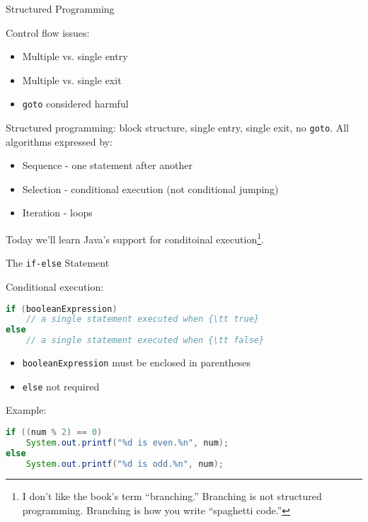 \documentclass{beamer}
\author[Chris Simpkins] 
{Christopher Simpkins \\\texttt{chris.simpkins@gatech.edu}}
\institute[Georgia Tech] %
\date{}
\begin{document}
\begin{frame}
  \titlepage
\end{frame}

\begin{frame}{Structured Programming}


Control flow issues:
\begin{itemize}
\item Multiple vs. single entry
\item Multiple vs. single exit
\item {\tt goto} considered harmful
\end{itemize}

Structured programming: block structure, single entry, single exit, no {\tt goto}.  All algorithms expressed by:
\begin{itemize}
\item Sequence - one statement after another
\item Selection - conditional execution (not conditional jumping)
\item Iteration - loops
\end{itemize}

Today we'll learn Java's support for conditoinal execution\footnote{I
  don't like the book's term ``branching.''  Branching is not
  structured programming.  Branching is how you write ``spaghetti code.''}.

\end{frame}

\begin{frame}[fragile]{The {\tt if-else} Statement}


Conditional execution:
\begin{lstlisting}[language=Java]
if (booleanExpression)
    // a single statement executed when {\tt true}
else
    // a single statement executed when {\tt false}
\end{lstlisting}
\vspace{-.1in}
\begin{itemize}
\item {\tt booleanExpression} must be enclosed in parentheses
\item {\tt else} not required
\end{itemize}
\vspace{-.1in}
Example:
\begin{lstlisting}[language=Java]
if ((num % 2) == 0)
    System.out.printf("%d is even.%n", num);
else
    System.out.printf("%d is odd.%n", num);
\end{lstlisting}

\end{frame}
\end{document}
